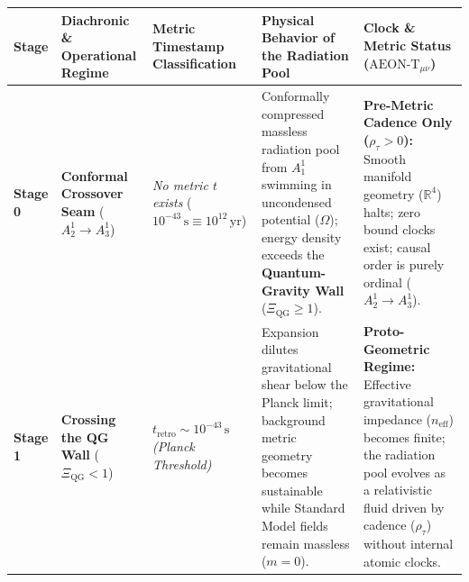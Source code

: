 \documentclass[
]{article}
\newcounter{none} %
\begin{document}
{\def\LTcaptype{none} %
\begin{longtable}[]{@{}
  >{\raggedright\arraybackslash}p{}
  >{\raggedright\arraybackslash}p{}
  >{\raggedright\arraybackslash}p{}
  >{\raggedright\arraybackslash}p{}
  >{\raggedright\arraybackslash}p{}@{}}
\toprule\noalign{}
\begin{minipage}[b]{\linewidth}\raggedright
Stage
\end{minipage} & \begin{minipage}[b]{\linewidth}\raggedright
Diachronic \& Operational Regime
\end{minipage} & \begin{minipage}[b]{\linewidth}\raggedright
Metric Timestamp Classification
\end{minipage} & \begin{minipage}[b]{\linewidth}\raggedright
Physical Behavior of the Radiation Pool
\end{minipage} & \begin{minipage}[b]{\linewidth}\raggedright
Clock \& Metric Status (\(\text{AEON-T}_{\mu\nu}\))
\end{minipage} \\
\midrule\noalign{}
\endhead
\bottomrule\noalign{}
\endlastfoot
\textbf{Stage 0} & \textbf{Conformal Crossover Seam}
(\(A_2^1 \to A_3^1\)) & \emph{No metric \(t\) exists}
(\(10^{-43}\,\mathrm{s} \equiv 10^{12}\,\mathrm{yr}\)) & Conformally
compressed massless radiation pool from \(A_1^1\) swimming in
uncondensed potential (\(\Omega\)); energy density exceeds the
\textbf{Quantum-Gravity Wall} (\(\Xi_{\mathrm{QG}} \ge 1\)). &
\textbf{Pre-Metric Cadence Only (\(\rho_\tau > 0\)):} Smooth manifold
geometry (\(\mathbb{R}^4\)) halts; zero bound clocks exist; causal order
is purely ordinal (\(A_2^1 \to A_3^1\)). \\
\textbf{Stage 1} & \textbf{Crossing the QG Wall}
(\(\Xi_{\mathrm{QG}} < 1\)) &
\(t_{\mathrm{retro}} \sim 10^{-43}\,\mathrm{s}\) \emph{(Planck
Threshold)} & Expansion dilutes gravitational shear below the Planck
limit; background metric geometry becomes sustainable while Standard
Model fields remain massless (\(m = 0\)). & \textbf{Proto-Geometric
Regime:} Effective gravitational impedance (\(n_{\mathrm{eff}}\))
becomes finite; the radiation pool evolves as a relativistic fluid
driven by cadence (\(\rho_\tau\)) without internal atomic clocks. \\

\end{longtable}}
\end{document}
